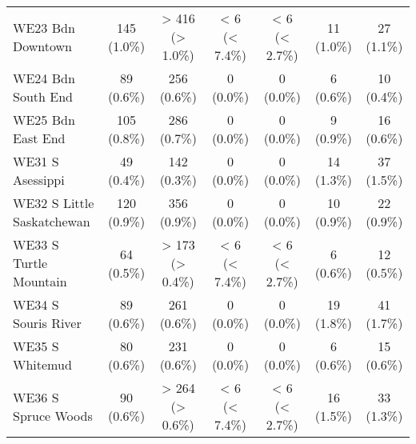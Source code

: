 \documentclass{article}
\begin{document}
\begin{table}[htbp]
\begin{longtable}{l*{6}{c}}
  WE23 Bdn Downtown                                     &           145 (1.0\%)           &         > 416 (> 1.0\%)         &          < 6 (< 7.4\%)          &          < 6 (< 2.7\%)          &            11 (1.0\%)           &            27 (1.1\%)           \\
  WE24 Bdn South End                                    &            89 (0.6\%)           &           256 (0.6\%)           &            0 (0.0\%)            &            0 (0.0\%)            &            6 (0.6\%)            &            10 (0.4\%)           \\
  WE25 Bdn East End                                     &           105 (0.8\%)           &           286 (0.7\%)           &            0 (0.0\%)            &            0 (0.0\%)            &            9 (0.9\%)            &            16 (0.6\%)           \\
  WE31 S Asessippi                                      &            49 (0.4\%)           &           142 (0.3\%)           &            0 (0.0\%)            &            0 (0.0\%)            &            14 (1.3\%)           &            37 (1.5\%)           \\
  WE32 S Little Saskatchewan                            &           120 (0.9\%)           &           356 (0.9\%)           &            0 (0.0\%)            &            0 (0.0\%)            &            10 (0.9\%)           &            22 (0.9\%)           \\
  WE33 S Turtle Mountain                                &            64 (0.5\%)           &         > 173 (> 0.4\%)         &          < 6 (< 7.4\%)          &          < 6 (< 2.7\%)          &            6 (0.6\%)            &            12 (0.5\%)           \\
  WE34 S Souris River                                   &            89 (0.6\%)           &           261 (0.6\%)           &            0 (0.0\%)            &            0 (0.0\%)            &            19 (1.8\%)           &            41 (1.7\%)           \\
  WE35 S Whitemud                                       &            80 (0.6\%)           &           231 (0.6\%)           &            0 (0.0\%)            &            0 (0.0\%)            &            6 (0.6\%)            &            15 (0.6\%)           \\
  WE36 S Spruce Woods                                   &            90 (0.6\%)           &         > 264 (> 0.6\%)         &          < 6 (< 7.4\%)          &          < 6 (< 2.7\%)          &            16 (1.5\%)           &            33 (1.3\%)           \\

\end{longtable}
\end{table}
\end{document}
